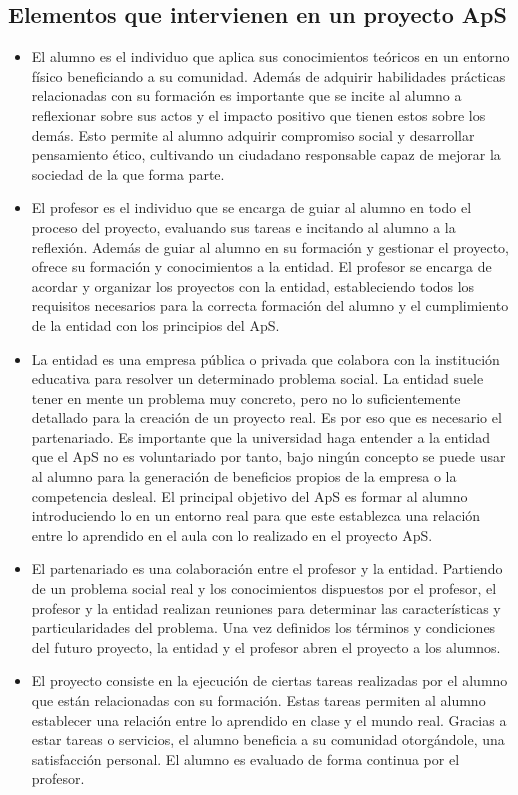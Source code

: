\documentclass{article}
\begin{document}
\subsection{Elementos que intervienen en un proyecto ApS}
\begin{itemize} 
	\item El alumno es el individuo que aplica sus conocimientos teóricos en un entorno físico beneficiando a su comunidad. Además de adquirir habilidades prácticas relacionadas con su formación es importante que se incite al alumno a reflexionar sobre sus actos y el impacto positivo que tienen estos sobre los demás. Esto permite al alumno adquirir compromiso social y desarrollar pensamiento ético, cultivando un ciudadano responsable capaz de mejorar la sociedad de la que forma parte.
	\item El profesor es el individuo que se encarga de guiar al alumno en todo el proceso del proyecto, evaluando sus tareas e incitando al alumno a la reflexión. Además de guiar al alumno en su formación y gestionar el proyecto, ofrece su formación y conocimientos a la entidad. El profesor se encarga de acordar y organizar los proyectos con la entidad, estableciendo todos los requisitos necesarios para la correcta formación del alumno y el cumplimiento de la entidad con los principios del ApS.
	\item La entidad es una empresa pública o privada que colabora con la institución educativa para resolver un determinado problema social. La entidad suele tener en mente un problema muy concreto, pero no lo suficientemente detallado para la creación de un proyecto real. Es por eso que es necesario el partenariado. Es importante que la universidad haga entender a la entidad que el ApS no es voluntariado por tanto, bajo ningún concepto se puede usar al alumno para la generación de beneficios propios de la empresa o la competencia desleal. El principal objetivo del ApS es formar al alumno introduciendo lo en un entorno real para que este establezca una relación entre lo aprendido en el aula con lo realizado en el proyecto ApS.
	\item El partenariado es una colaboración entre el profesor y la entidad. Partiendo de un problema social real y los conocimientos dispuestos por el profesor, el profesor y la entidad realizan reuniones para determinar las características y particularidades del problema. Una vez definidos los términos y condiciones del futuro proyecto, la entidad y el profesor abren el proyecto a los alumnos.
	\item El proyecto consiste en la ejecución de ciertas tareas realizadas por el alumno que están relacionadas con su formación. Estas tareas permiten al alumno establecer una relación entre lo aprendido en clase y el mundo real. Gracias a estar tareas o servicios, el alumno beneficia a su comunidad otorgándole, una satisfacción personal. El alumno es evaluado de forma continua por el profesor.
\end{itemize}
\end{document}
